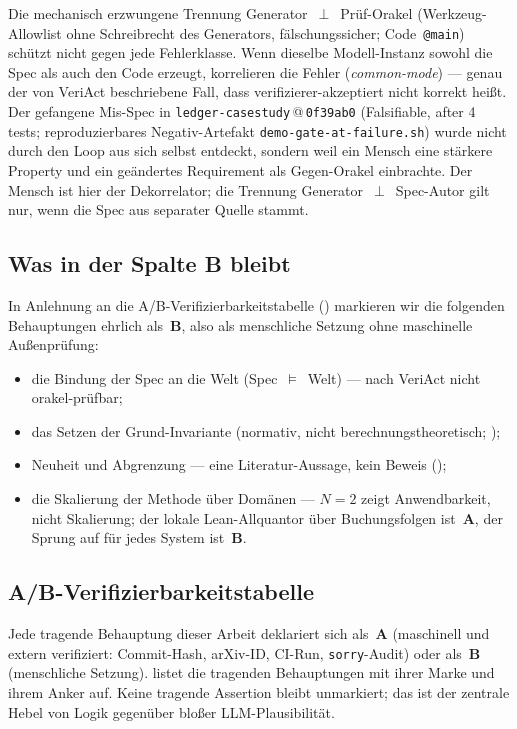 \documentclass[11pt,a4paper]{article}
\newcommand{\AB}[1]{\textbf{#1}}
\theoremstyle{definition}
\theoremstyle{remark}
\begin{document}
Die mechanisch erzwungene Trennung Generator~$\perp$~Prüf-Orakel
(Werkzeug-Allowlist ohne Schreibrecht des Generators, fälschungssicher;
Code~\texttt{@main}) schützt nicht gegen jede Fehlerklasse. Wenn dieselbe
Modell-Instanz sowohl die Spec als auch den Code erzeugt, korrelieren die Fehler
(\emph{common-mode}) --- genau der von VeriAct \cite{veriact2026} beschriebene
Fall, dass verifizierer-akzeptiert nicht korrekt heißt. Der gefangene Mis-Spec
in \texttt{ledger-casestudy}\,@\,\texttt{0f39ab0} (\glqq Falsifiable, after 4 tests\grqq;
reproduzierbares Negativ-Artefakt \texttt{demo-gate-at-failure.sh}) wurde nicht
durch den Loop aus sich selbst entdeckt, sondern weil ein Mensch eine stärkere
Property und ein geändertes Requirement als Gegen-Orakel einbrachte. Der Mensch
ist hier der Dekorrelator; die Trennung Generator~$\perp$~Spec-Autor gilt nur,
wenn die Spec aus separater Quelle stammt.

\subsection{Was in der Spalte B bleibt}
\label{sec:grenzen-restb}

In Anlehnung an die A/B-Verifizierbarkeitstabelle ()
markieren wir die folgenden Behauptungen ehrlich als~\AB{B}, also als menschliche
Setzung ohne maschinelle Außenprüfung:

\begin{itemize}
  \item die Bindung der Spec an die Welt (Spec~$\models$~Welt) --- nach
        VeriAct \cite{veriact2026} nicht orakel-prüfbar;
  \item das Setzen der Grund-Invariante (normativ, nicht berechnungstheoretisch;
        );
  \item Neuheit und Abgrenzung --- eine Literatur-Aussage, kein Beweis
        ();
  \item die Skalierung der Methode über Domänen --- $N=2$ zeigt Anwendbarkeit,
        nicht Skalierung; der lokale Lean-Allquantor über Buchungsfolgen
        ist~\AB{A}, der Sprung auf \glqq für jedes System\grqq{} ist~\AB{B}.
\end{itemize}

\subsection{A/B-Verifizierbarkeitstabelle}
\label{sec:grenzen-ab}
Jede tragende Behauptung dieser Arbeit deklariert sich als~\AB{A} (maschinell und
extern verifiziert: Commit-Hash, arXiv-ID, CI-Run, \texttt{sorry}-Audit) oder
als~\AB{B} (menschliche Setzung).  listet die tragenden Behauptungen mit
ihrer Marke und ihrem Anker auf. Keine tragende Assertion bleibt unmarkiert; das
ist der zentrale Hebel von Logik gegenüber bloßer LLM-Plausibilität.
\end{document}
